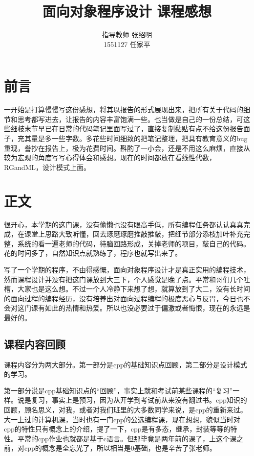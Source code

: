 \documentclass[a4paper,16pt,UTF8]{article}
\begin{document}
    \title{\Huge 面向对象程序设计 课程感想}
    \author{指导教师 \quad 张绍明\\
            1551127 \quad 任家平}
    \date{}
    \maketitle

    \section{\LARGE 前言}

    一开始是打算慢慢写这份感想，将其以报告的形式展现出来，把所有关于代码的细节和思考都写进去，让报告的内容丰富饱满一些。也当做是自己的一份总结，可这些细枝末节早已在日常的代码笔记里面写过了，直接复制黏贴有点不给这份报告面子，充其量是多一些字数。多花些时间细致的把笔记整理，把具有教育意义的bug重现，誊抄在报告上，极为花费时间。斟酌了一小会，还是不用这么麻烦，直接从较为宏观的角度写写心得体会和感想。现在的时间都放在看线性代数，RGandML，设计模式上面。

    \section{\LARGE 正文}

    很开心，本学期的这门课，没有偷懒也没有眼高手低，所有编程任务都认认真真完成，在课堂上思路大致听懂，回去琢磨琢磨推敲推敲，把细节部分添枝加叶补充完整，系统的看一遍老师的代码，待脑回路形成，关掉老师的项目，敲自己的代码。花的时间多了，自然知识点就熟练了，程序也就写出来了。

    写了一个学期的程序，不由得感慨，面向对象程序设计才是真正实用的编程技术，然而课程设计并没有把这门课放到大三下，个人感觉是晚了点。平常和哥们几个吐槽，大家也是这么想。不过一个人冷静下来想了想，就算放到了大二，没有长时间的面向过程的编程经历，没有培养出对面向过程编程的极度恶心与反胃，今日也不会对这门课有如此的热情和热爱。所以也没必要过于偏激或者悔恨，现在的永远是最好的。

    \subsection{\Large 课程内容回顾}
    
    课程内容分为两大部分。第一部分是cpp的基础知识点回顾，第二部分是设计模式的学习。

    第一部分说是cpp基础知识点的“回顾”，事实上就和考试前某些课程的“复习”一样。说是复习，事实上是预习，因为从开学到考试前从来没有翻过书。cpp知识的回顾，顾名思义，对我，或者对我们班里的大多数同学来说，是cpp的重新来过。大一上过的计算机课，当时也有一门cpp的公选编程课，现在想想，貌似当时对cpp的特性只有概念上的介绍，提了一下，cpp是有多态，继承，封装等等的特性。平常的cpp作业也就都是基于c语言。但那毕竟是两年前的课了，上这个课之前，对cpp的概念是全忘光了，所以相当是0基础，也是辛苦了张老师。
\end{document}
